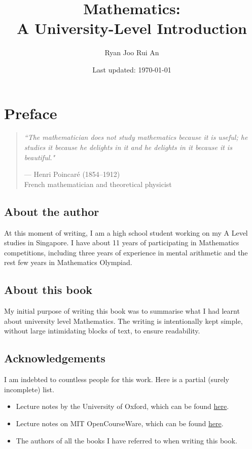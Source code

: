 \documentclass[12pt,a4 paper]{extreport}
\begin{document}


\begin{titlepage}
\title{Mathematics:\\
A University-Level Introduction}
\author{Ryan Joo Rui An}
\date{Last updated: \today}
\end{titlepage}

\maketitle

\chapter*{Preface}
\begin{quote}
\textit{``The mathematician does not study mathematics because it is useful; he studies it because he delights in it and he delights in it because it is beautiful."}

\begin{flushright}--- Henri Poincar{\'e} (1854--1912)\\
French mathematician and theoretical physicist\end{flushright}
\end{quote}

\section*{About the author}
At this moment of writing, I am a high school student working on my A Level studies in Singapore. I have about 11 years of participating in Mathematics competitions, including three years of experience in mental arithmetic and the rest few years in Mathematics Olympiad.

\section*{About this book}
My initial purpose of writing this book was to summarise what I had learnt about university level Mathematics. The writing is intentionally kept simple, without large intimidating blocks of text, to ensure readability. 

\section*{Acknowledgements}
I am indebted to countless people for this work. Here is a partial (surely incomplete) list.
\begin{itemize}
\item Lecture notes by the University of Oxford, which can be found \href{https://courses.maths.ox.ac.uk/}{here}.
\item Lecture notes on MIT OpenCourseWare, which can be found \href{https://ocw.mit.edu/}{here}.
\item The authors of all the books I have referred to when writing this book.
\end{itemize}
\end{document}
